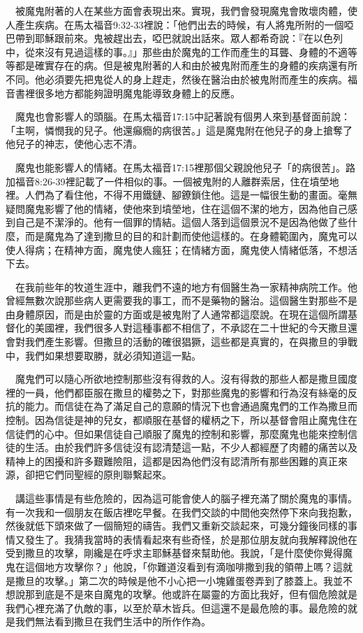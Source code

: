 \documentclass{book}
\begin{document}
　被魔鬼附著的人在某些方面會表現出來。實現，我們會發現魔鬼會敗壞肉體，使人產生疾病。在馬太福音9:32-33裡說：「他們出去的時候，有人將鬼所附的一個啞巴帶到耶穌跟前來。鬼被趕出去，啞巴就說出話來。眾人都希奇說：『在以色列中，從來沒有見過這樣的事。』」那些由於魔鬼的工作而產生的耳聾、身體的不適等等都是確實存在的病。但是被鬼附著的人和由於被鬼附而產生的身體的疾病還有所不同。他必須要先把鬼從人的身上趕走，然後在醫治由於被鬼附而產生的疾病。福音書裡很多地方都能夠證明魔鬼能導致身體上的反應。

　魔鬼也會影響人的頭腦。在馬太福音17:15中記著說有個男人來到基督面前說：「主啊，憐憫我的兒子。他還癲癇的病很苦。」這是魔鬼附在他兒子的身上搶奪了他兒子的神志，使他心志不清。

　魔鬼也能影響人的情緒。在馬太福音17:15裡那個父親說他兒子「的病很苦」。路加福音8:26-39裡記載了一件相似的事。一個被鬼附的人離群索居，住在墳塋地裡。人們為了看住他，不得不用鐵鏈、腳鐐鎖住他。這是一幅很生動的畫面。毫無疑問魔鬼影響了他的情緒，使他來到墳塋地，住在這個不潔的地方，因為他自己感到自己是不潔淨的。他有一個罪的情結。這個人落到這個景況不是因為他做了些什麼，而是魔鬼為了達到撒旦的目的和計劃而使他這樣的。在身體範圍內，魔鬼可以使人得病；在精神方面，魔鬼使人瘋狂；在情緒方面，魔鬼使人情緒低落，不想活下去。

　在我前些年的牧道生涯中，離我們不遠的地方有個醫生為一家精神病院工作。他曾經無數次說那些病人更需要我的事工，而不是藥物的醫治。這個醫生對那些不是由身體原因，而是由於靈的方面或是被鬼附了人通常都這麼說。在現在這個所謂基督化的美國裡，我們很多人對這種事都不相信了，不承認在二十世紀的今天撒旦還會對我們產生影響。但撒旦的活動的確很猖獗，這些都是真實的，在與撒旦的爭戰中，我們如果想要取勝，就必須知道這一點。

　魔鬼們可以隨心所欲地控制那些沒有得救的人。沒有得救的那些人都是撒旦國度裡的一員，他們都臣服在撒旦的權勢之下，對那些魔鬼的影響和行為沒有絲毫的反抗的能力。而信徒在為了滿足自己的意願的情況下也會通過魔鬼們的工作為撒旦而控制。因為信徒是神的兒女，都順服在基督的權柄之下，所以基督會阻止魔鬼住在信徒們的心中。但如果信徒自己順服了魔鬼的控制和影響，那麼魔鬼也能來控制信徒的生活。由於我們許多信徒沒有認清楚這一點，不少人都經歷了肉體的痛苦以及精神上的困擾和許多艱難險阻，這都是因為他們沒有認清所有那些困難的真正來源，卻把它們同聖經的原則聯繫起來。

　講這些事情是有些危險的，因為這可能會使人的腦子裡充滿了關於魔鬼的事情。有一次我和一個朋友在飯店裡吃早餐。在我們交談的中間他突然停下來向我抱歉，然後就低下頭來做了一個簡短的禱告。我們又重新交談起來，可幾分鐘後同樣的事情又發生了。我猜我當時的表情看起來有些奇怪，於是那位朋友就向我解釋說他在受到撒旦的攻擊，剛纔是在呼求主耶穌基督來幫助他。我說，「是什麼使你覺得魔鬼在這個地方攻擊你？」他說，「你難道沒看到有滴咖啡撒到我的領帶上嗎？這就是撒旦的攻擊。」第二次的時候是他不小心把一小塊雞蛋卷弄到了膝蓋上。我並不想說那到底是不是來自魔鬼的攻擊。他或許在屬靈的方面比我好，但有個危險就是我們心裡充滿了仇敵的事，以至於草木皆兵。但這還不是最危險的事。最危險的就是我們無法看到撒旦在我們生活中的所作作為。
\end{document}
